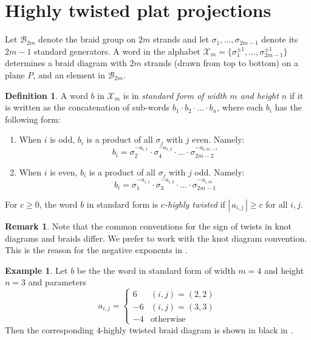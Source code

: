 \documentclass[12pt,reqno]{amsart}
\theoremstyle{plain}
\theoremstyle{definition}
\newtheorem{definition}[theorem]{Definition}
\newtheorem{example}[theorem]{Example}
\newtheorem{remark}[theorem]{Remark}
\newcommand{\abs}[1]{{\left\vert\, #1 \,\right\vert}}
\begin{document}
\section{Highly twisted plat projections}\label{sec:Preliminaries}

Let $\mathcal{B}_{2m}$ denote the braid group on $2m$ strands and let 
$\sigma_1,\dots,\sigma_{2m-1}$ denote its $2m - 1$ standard 
generators. A word in the alphabet 
$\mathcal{X}_m = \{\sigma_1^{\pm 1},\dots,\sigma_{2m-1}^{\pm 1}\}$
determines a braid diagram with $2m$ strands (drawn from top to bottom) 
on a plane $P$, and an element in $\mathcal{B}_{2m}$.

\begin{definition}\label{def: highly twisted braid}
A word $b$ in $\mathcal{X}_m$ is in \emph{standard form of width $m$ and 
height $n$} if it is written as the concatenation of sub-words
$b_1\cdot b_2 \cdot \dots \cdot b_{n}$, 
where each $b_i$ has the following form:
\begin{enumerate}
\item When $i$ is odd, $b_i$ is a product of all $\sigma_j$ with $j$
  even. Namely:
\[b_i = \sigma_2^{-a_{i, 1}} \cdot \sigma_4^{-a_{i, 2}} \cdot \dots \cdot
\sigma_{2m-2}^{-a_{i, m-1}}\]

\item When $i$ is even, $b_i$ is a product of all $\sigma_j$ with $j$
  odd. Namely:
\[b_i = \sigma_1^{-a_{i, 1}} \cdot \sigma_3^{-a_{i, 2}} \cdot \dots \cdot
\sigma_{2m - 1}^{-a_{i, m}}\]
\end{enumerate}

For $c\ge 0$, the word $b$ in standard form is \emph{$c$-highly twisted} if 
$\abs{a_{i,j}}\geq c$ for all $i,j$.
\end{definition}

\begin{remark}
Note that the common conventions for the sign of twists in knot diagrams 
and braids differ. We prefer to work with the knot diagram convention. 
This is the reason for the negative exponents in .
\end{remark}

\begin{example}\label{plat example}
Let $b$ be the the word in standard form of width $m=4$ and height $n=3$
and parameters 
\[ 
a_{i,j} = \begin{cases} 6 &(i,j)=(2,2)\\ -6 &(i,j)=(3,3)\\ -4 &\text{otherwise}\end{cases}
\]
Then the corresponding $4$-highly twisted braid diagram is shown in black in . 
\end{example}
\end{document}
